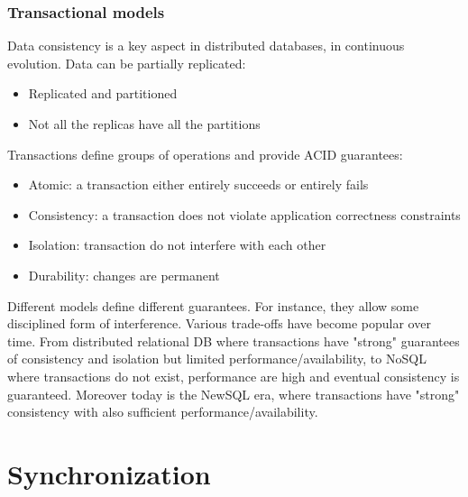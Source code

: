 \documentclass[10pt,a4paper]{article}
\begin{document}
\subsubsection{Transactional models}
Data consistency is a key aspect in distributed databases, in continuous evolution. Data can be partially replicated:
\begin{itemize}
	\item Replicated and partitioned
	\item Not all the replicas have all the partitions
\end{itemize}
Transactions define groups of operations and provide ACID guarantees:
\begin{itemize}
	\item Atomic: a transaction either entirely succeeds or entirely fails
	\item Consistency: a transaction does not violate application correctness constraints
	\item Isolation: transaction do not interfere with each other
	\item Durability: changes are permanent
\end{itemize}
Different models define different guarantees. For instance, they allow some disciplined form of interference. Various trade-offs have become popular over time. From distributed relational DB where transactions have "strong" guarantees of consistency and isolation but limited performance/availability, to NoSQL where transactions do not exist, performance are high and eventual consistency is guaranteed. Moreover today is the NewSQL era, where transactions have "strong" consistency with also sufficient performance/availability. \pagebreak
\section{\LARGE Synchronization}
\end{document}
